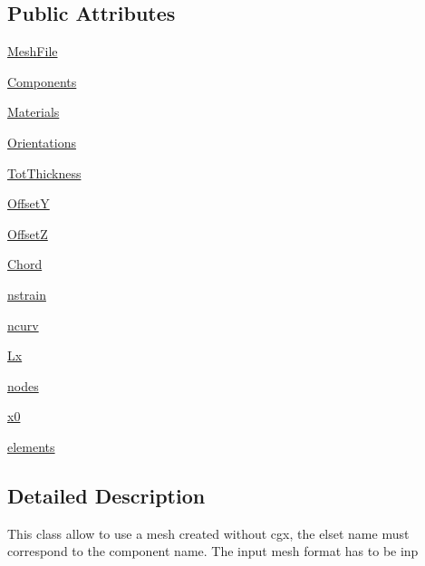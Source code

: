 \subsection*{Public Attributes}
\begin{DoxyCompactItemize}
\item 
\hyperlink{classgebtaero_1_1_external_mesh_1_1_external_mesh_a53b38c75b026fb6c56b50b2dd9b5270f}{Mesh\+File}
\item 
\hyperlink{classgebtaero_1_1_external_mesh_1_1_external_mesh_a592c0deea81b1ba0e686add0943889b4}{Components}
\item 
\hyperlink{classgebtaero_1_1_external_mesh_1_1_external_mesh_a60dc1666f258188383bc1a172bb3d219}{Materials}
\item 
\hyperlink{classgebtaero_1_1_external_mesh_1_1_external_mesh_a531dc1641becd6ea9cc5225ddfea8752}{Orientations}
\item 
\hyperlink{classgebtaero_1_1_external_mesh_1_1_external_mesh_a6e7c70282c461d0a68a05419bf152973}{Tot\+Thickness}
\item 
\hyperlink{classgebtaero_1_1_external_mesh_1_1_external_mesh_a87faefe634a474727d516e58eb8bf944}{OffsetY}
\item 
\hyperlink{classgebtaero_1_1_external_mesh_1_1_external_mesh_a6639038ee73b225cf0d3ea1bd9c52783}{OffsetZ}
\item 
\hyperlink{classgebtaero_1_1_external_mesh_1_1_external_mesh_ac9f8fc4f8dd8e81757bc8a5b2b5323d4}{Chord}
\item 
\hyperlink{classgebtaero_1_1_external_mesh_1_1_external_mesh_ac8524a9940fbf969271113875fd4da1a}{nstrain}
\item 
\hyperlink{classgebtaero_1_1_external_mesh_1_1_external_mesh_ac11f9e6adddf7c9e5ae563d694d4b1b9}{ncurv}
\item 
\hyperlink{classgebtaero_1_1_external_mesh_1_1_external_mesh_a7804df618265ca2d1e76ba4697139f9d}{Lx}
\item 
\hyperlink{classgebtaero_1_1_external_mesh_1_1_external_mesh_abb7c716a5f2adf2a1f878b1034dcdc57}{nodes}
\item 
\hyperlink{classgebtaero_1_1_external_mesh_1_1_external_mesh_acaa3b125cb4f80848007b82426c14ffa}{x0}
\item 
\hyperlink{classgebtaero_1_1_external_mesh_1_1_external_mesh_a1a044fbcf39f5f8e7d3e3b98d291010d}{elements}
\end{DoxyCompactItemize}


\subsection{Detailed Description}
\begin{DoxyVerb}This class allow to use a mesh created without cgx, the elset name must correspond to the component name. 
The input mesh format has to be inp
\end{DoxyVerb}
 

